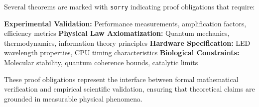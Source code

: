 Several theorems are marked with \texttt{sorry} indicating proof obligations that require:

\textbf{Experimental Validation:} Performance measurements, amplification factors, efficiency metrics
\textbf{Physical Law Axiomatization:} Quantum mechanics, thermodynamics, information theory principles  
\textbf{Hardware Specification:} LED wavelength properties, CPU timing characteristics
\textbf{Biological Constraints:} Molecular stability, quantum coherence bounds, catalytic limits

These proof obligations represent the interface between formal mathematical verification and empirical scientific validation, ensuring that theoretical claims are grounded in measurable physical phenomena.
